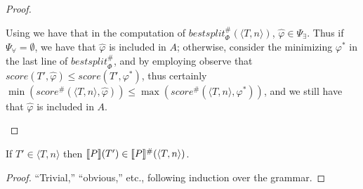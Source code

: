 \begin{proof}
\begin{itemize}
        Using \rone we have that in the computation of $\mathit{bestsplit}^\#_\Phi(\langle T, n \rangle)$,
        $\hat{\varphi} \in \Psi_\exists$.
        Thus if $\Psi_\forall = \emptyset$, we have that $\hat{\varphi}$ is included in $A$;
        otherwise, consider the minimizing $\varphi^*$ in the last line of $\mathit{bestsplit}^\#_\Phi$,
        and by employing \rtwo observe that $\mathit{score}(T', \hat{\varphi}) \leq \mathit{score}(T', \varphi^*)$,
        thus certainly $\min(\mathit{score}^\#(\langle T, n \rangle, \hat{\varphi})) \leq
        \max(\mathit{score}^\#(\langle T, n \rangle, \varphi^*))$,
        and we still have that $\hat{\varphi}$ is included in $A$.
\end{itemize}
\end{proof}
\begin{theorem}[Soundness]
If $T' \in \langle T, n \rangle$ then $\den{P}(T') \in \den{P}^\#(\langle T, n \rangle)$.
\end{theorem}
\begin{proof}
``Trivial,'' ``obvious,'' etc., following induction over the grammar.
\end{proof}
